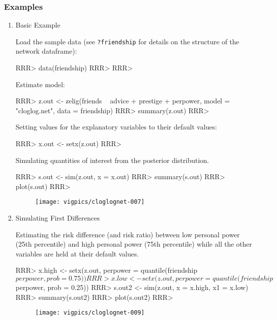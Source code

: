 \subsubsection{Examples} 
\begin{enumerate} 
\item Basic Example 
 
Load the sample data (see {\tt ?friendship} for details on the structure of the network dataframe): 
 
\begin{Schunk}
\begin{Sinput}
RRR> data(friendship) 
RRR>  
RRR>  
\end{Sinput}
\end{Schunk}
Estimate model: 
 
\begin{Schunk}
\begin{Sinput}
RRR> z.out <- zelig(friends ~ advice + prestige + perpower, model = "cloglog.net", data = friendship) 
RRR> summary(z.out) 
RRR>  
\end{Sinput}
\end{Schunk}
Setting values for the explanatory variables to their default values: 
 
\begin{Schunk}
\begin{Sinput}
RRR>  x.out <- setx(z.out) 
RRR>  
\end{Sinput}
\end{Schunk}
Simulating quantities of interest from the posterior distribution. 
\begin{Schunk}
\begin{Sinput}
RRR> s.out <- sim(z.out, x = x.out)  
RRR> summary(s.out)  
RRR> plot(s.out)  
RRR>  
\end{Sinput}
\end{Schunk}
 
\begin{figure}[here] 
\centering 
\texttt{[image: vigpics/cloglognet-007]}
\label{fig:plotgam} 
\end{figure} 
 
\item Simulating First Differences 
 
Estimating the risk difference (and risk ratio) between low personal power (25th percentile) and high personal power (75th percentile) while all the other variables are held at their default values.  
 
\begin{Schunk}
\begin{Sinput}
RRR> x.high <- setx(z.out, perpower = quantile(friendship$perpower, prob = 0.75))     
RRR> x.low  <- setx(z.out, perpower = quantile(friendship$perpower, prob = 0.25)) 
RRR> s.out2 <- sim(z.out, x = x.high, x1 = x.low)    
RRR> summary(s.out2)    
RRR> plot(s.out2)    
RRR>  
\end{Sinput}
\end{Schunk}
 
\begin{figure}[here] 
\centering 
\texttt{[image: vigpics/cloglognet-009]}
\label{fig:plotgam} 
\end{figure} 
 
 
\end{enumerate} 
 
